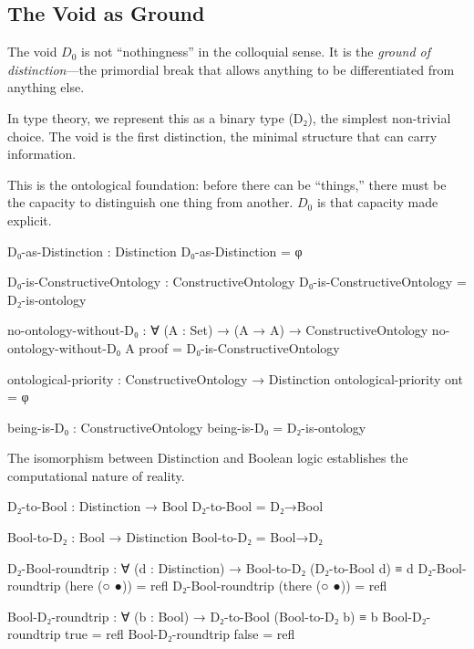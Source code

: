\documentclass[11pt,a4paper]{book}
\def\texttt#1{#1}%
\begin{document}
\subsection{The Void as Ground}

The void $D_0$ is not ``nothingness'' in the colloquial sense. It is the \emph{ground of distinction}---the primordial break that allows anything to be differentiated from anything else.

In type theory, we represent this as a binary type (\texttt{D₂}), the simplest non-trivial choice.
The void is the first distinction, the minimal structure that can carry information.

This is the ontological foundation: before there can be ``things,'' there must be the capacity to distinguish one thing from another.
$D_0$ is that capacity made explicit.

\begin{code}
D₀-as-Distinction : Distinction
D₀-as-Distinction = φ

D₀-is-ConstructiveOntology : ConstructiveOntology
D₀-is-ConstructiveOntology = D₂-is-ontology
\end{code}

\begin{code}
no-ontology-without-D₀ : 
  ∀ (A : Set) → 
  (A → A) →
  ConstructiveOntology
no-ontology-without-D₀ A proof = D₀-is-ConstructiveOntology

ontological-priority : 
  ConstructiveOntology → 
  Distinction
ontological-priority ont = φ

being-is-D₀ : ConstructiveOntology
being-is-D₀ = D₂-is-ontology

\end{code}

The isomorphism between Distinction and Boolean logic establishes the computational nature of reality.

\begin{code}
D₂-to-Bool : Distinction → Bool
D₂-to-Bool = D₂→Bool

Bool-to-D₂ : Bool → Distinction
Bool-to-D₂ = Bool→D₂
\end{code}

\begin{code}
D₂-Bool-roundtrip : ∀ (d : Distinction) → Bool-to-D₂ (D₂-to-Bool d) ≡ d
D₂-Bool-roundtrip (here (○ ●))  = refl
D₂-Bool-roundtrip (there (○ ●)) = refl

Bool-D₂-roundtrip : ∀ (b : Bool) → D₂-to-Bool (Bool-to-D₂ b) ≡ b
Bool-D₂-roundtrip true  = refl
Bool-D₂-roundtrip false = refl
\end{code}
\end{document}
